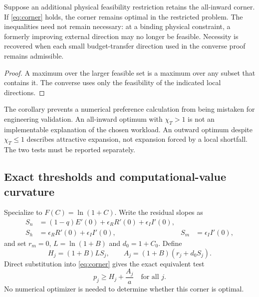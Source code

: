 \begin{corollary}
\label{cor:feasibility}
Suppose an additional physical feasibility restriction retains the all-inward corner. If \cref{eq:corner} holds, the corner remains optimal in the restricted problem. The inequalities need not remain necessary: at a binding physical constraint, a formerly improving external direction may no longer be feasible. Necessity is recovered when each small budget-transfer direction used in the converse proof remains admissible.
\end{corollary}
\begin{proof}
A maximum over the larger feasible set is a maximum over any subset that contains it. The converse uses only the feasibility of the indicated local directions.
\end{proof}

The corollary prevents a numerical preference calculation from being mistaken for engineering validation. An all-inward optimum with $\chi_T>1$ is not an implementable explanation of the chosen workload. An outward optimum despite $\chi_T\leq1$ describes attractive expansion, not expansion forced by a local shortfall. The two tests must be reported separately.

\subsection{Exact thresholds and computational-value curvature}
\label{sec:threshold}

Specialize to $F(C)=\ln(1+C)$. Write the residual slopes as
\begin{align}
 S_n&=(1-q)E'(0)+\epsilon_RR'(0)+\epsilon_II'(0),\nonumber\\
 S_h&=\epsilon_RR'(0)+\epsilon_II'(0),& S_m&=\epsilon_II'(0),
 \label{eq:slopes}
\end{align}
and set $r_m=0$, $L=\ln(1+B)$ and $d_0=1+C_0$. Define
\begin{equation}
 H_j=(1+B)L S_j,\qquad A_j=(1+B)(r_j+d_0S_j).
 \label{eq:HA}
\end{equation}
Direct substitution into \cref{eq:corner} gives the exact equivalent test
\begin{equation}
 \boxed{p_j\geq H_j+\frac{A_j}{a}\quad\text{for all }j.}
 \label{eq:exact}
\end{equation}
No numerical optimizer is needed to determine whether this corner is optimal.

